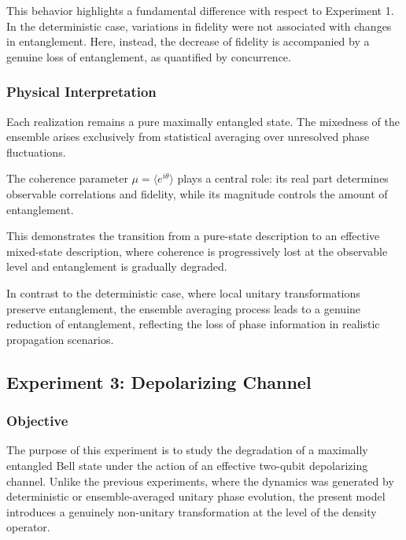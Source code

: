 \documentclass[a4paper]{article}
\begin{document}
This behavior highlights a fundamental difference with respect to Experiment 1. In the deterministic case, variations in fidelity were not associated with changes in entanglement. Here, instead, the decrease of fidelity is accompanied by a genuine loss of entanglement, as quantified by concurrence.

\subsubsection{Physical Interpretation}

Each realization remains a pure maximally entangled state. The mixedness of the ensemble arises exclusively from statistical averaging over unresolved phase fluctuations.

The coherence parameter \(\mu = \langle e^{i\theta} \rangle\) plays a central role: its real part determines observable correlations and fidelity, while its magnitude controls the amount of entanglement.

This demonstrates the transition from a pure-state description to an effective mixed-state description, where coherence is progressively lost at the observable level and entanglement is gradually degraded.

In contrast to the deterministic case, where local unitary transformations preserve entanglement, the ensemble averaging process leads to a genuine reduction of entanglement, reflecting the loss of phase information in realistic propagation scenarios.

\subsection{Experiment 3: Depolarizing Channel}

\subsubsection{Objective}

The purpose of this experiment is to study the degradation of a maximally entangled Bell state under the action of an effective two-qubit depolarizing channel. Unlike the previous experiments, where the dynamics was generated by deterministic or ensemble-averaged unitary phase evolution, the present model introduces a genuinely non-unitary transformation at the level of the density operator.
\end{document}
